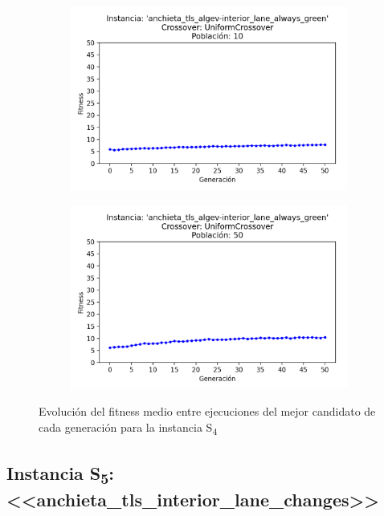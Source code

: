 \begin{figure}[h]
\begin{subfigure}[t]{.49\textwidth}
      \includegraphics[width=\textwidth]{report/images/estudio/anchieta_tls_algev-interior_lane_always_green-UniformCrossover-10.png}
    \end{subfigure}
    \hfill
    \begin{subfigure}[t]{.49\textwidth}
      \centering
      \includegraphics[width=\textwidth]{report/images/estudio/anchieta_tls_algev-interior_lane_always_green-UniformCrossover-50.png}
    \end{subfigure}
    \caption{Evolución del fitness medio entre ejecuciones del mejor candidato de cada generación para la instancia S\textsubscript{4}}
    \label{fig:estudio:anchieta_tls_interior_lane_always_green}
\end{figure}

\subsection{Instancia S\textsubscript{5}: <<anchieta\_tls\_interior\_lane\_changes>>}

